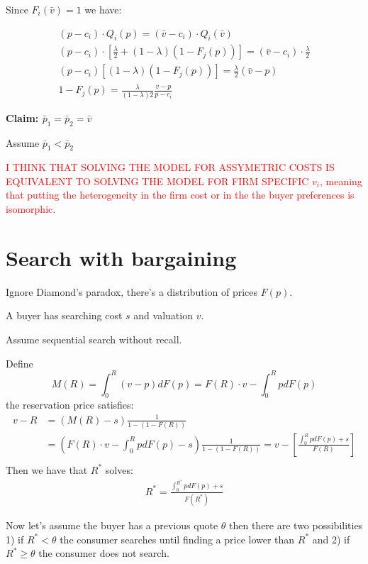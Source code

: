 \documentclass[12pt]{article}
\theoremstyle{plain}
\theoremstyle{plain}
\begin{document}
Since $F_i(\bar{v}) =1$ we have: 

\begin{align*}
    (p - c_i) \cdot Q_i(p) = (\bar{v}-c_i) \cdot Q_i(\bar{v}) \\
     (p - c_i) \cdot \left[\frac{\lambda}{2} +  (1 - \lambda) (1 - F_j(p))\right] = (\bar{v}-c_i) \cdot \frac{\lambda}{2} \\
     (p- c_i)  \left[ (1 - \lambda)  (1 - F_j(p))\right] = \frac{\lambda}{2}(\bar{v}-p) \\
     1 - F_j(p) = \frac{\lambda}{(1 - \lambda)2}\frac{\bar{v}-p}{p- c_i} 
\end{align*}

\vspace{2cm}

\textbf{Claim: $\bar{p}_1 =\bar{p}_2 =\bar{v}$ } 

Assume $\bar{p}_1 < \bar{p}_2$

\textcolor{red}{I THINK THAT SOLVING THE MODEL FOR ASSYMETRIC COSTS IS EQUIVALENT TO SOLVING THE MODEL FOR FIRM SPECIFIC $v_i$, meaning that putting the heterogeneity in the firm cost or in the the buyer preferences is isomorphic. }


\newpage 

\section{Search with bargaining}

Ignore Diamond's paradox, there's a distribution of prices $F(p)$. 

A buyer has searching cost $s$ and valuation $v$. 

Assume sequential search without recall. 

Define
$$M(R) = \int_0^R (v-p)dF(p) = F(R)\cdot v - \int_0^R pdF(p)$$ 
the reservation price satisfies: 
\begin{align*}
        v-R &= (M(R)-s)\frac{1}{1-(1-F(R))} \\
   &= \left(F(R)\cdot v - \int_0^R pdF(p)-s\right)\frac{1}{1-(1-F(R))} = v - \left[\frac{\int_0^R pdF(p)+s}{F(R)}\right]\\
\end{align*}
Then we have that $R^*$ solves: 
\begin{align}
        R^* = \frac{\int_0^{R^*} pdF(p)+s}{F(R^*)}
\end{align}

Now let's assume the buyer has a previous quote $\theta$ then there are two possibilities 1) if $ R^*< \theta $ the consumer searches until finding a price lower than $R^*$ and 2) if $R^*\geq \theta$ the consumer does not search.
\end{document}
